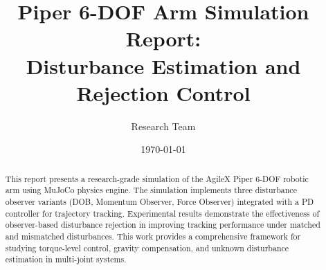 \documentclass[a4paper,11pt]{article}
\title{Piper 6-DOF Arm Simulation Report:\\ Disturbance Estimation and Rejection Control}
\author{Research Team}
\date{\today}
\begin{document}
    \maketitle

    \begin{abstract}
        This report presents a research-grade simulation of the AgileX Piper 6-DOF robotic arm using MuJoCo physics engine. The simulation implements three disturbance observer variants (DOB, Momentum Observer, Force Observer) integrated with a PD controller for trajectory tracking. Experimental results demonstrate the effectiveness of observer-based disturbance rejection in improving tracking performance under matched and mismatched disturbances. This work provides a comprehensive framework for studying torque-level control, gravity compensation, and unknown disturbance estimation in multi-joint systems.
    \end{abstract}

    \tableofcontents
    \newpage

    
    \newpage
    
    \newpage
    
    \newpage
    
    \newpage
    
    \newpage
    

    \newpage
    
    
\end{document}
